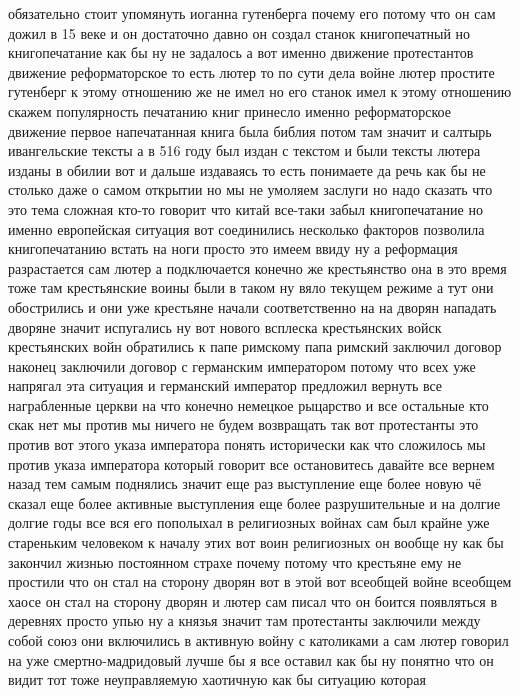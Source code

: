 обязательно стоит упомянуть иоганна гутенберга
почему его потому что он сам дожил в 15 веке и он достаточно давно он создал
станок книгопечатный но книгопечатание как бы ну не задалось а вот именно
движение протестантов движение реформаторское то есть лютер то по сути дела
войне лютер простите гутенберг к этому отношению же не имел но его станок имел к
этому отношению скажем популярность печатанию книг принесло именно
реформаторское движение первое напечатанная книга была библия потом там значит и
салтырь ивангельские тексты а в 516 году был издан с текстом и были тексты
лютера изданы в обилии вот и дальше издаваясь то есть понимаете да речь как бы
не столько даже о самом открытии но мы не умоляем заслуги но надо сказать что
это тема сложная кто-то говорит что китай все-таки забыл книгопечатание но
именно европейская ситуация вот соединились несколько факторов позволила
книгопечатанию встать на ноги просто это имеем ввиду ну а реформация
разрастается сам лютер а подключается конечно же крестьянство она в это время
тоже там крестьянские воины были в таком ну вяло текущем режиме а тут они
обострились и они уже крестьяне начали соответственно на на дворян нападать
дворяне значит испугались ну вот нового всплеска крестьянских войск крестьянских
войн обратились к папе римскому папа римский заключил договор наконец заключили
договор с германским императором потому что всех уже напрягал эта ситуация и
германский император предложил вернуть все награбленные церкви на что конечно
немецкое рыцарство и все остальные кто скак нет мы против мы ничего не будем
возвращать так вот протестанты это против вот этого указа императора понять
исторически как что сложилось мы против указа императора который говорит все
остановитесь давайте все вернем назад тем самым поднялись значит еще раз
выступление еще более новую чё сказал еще более активные выступления еще более
разрушительные и на долгие долгие годы все вся его пополыхал в религиозных
войнах сам был крайне уже стареньким человеком к началу этих вот воин
религиозных он вообще ну как бы закончил жизнью постоянном страхе почему потому
что крестьяне ему не простили что он стал на сторону дворян вот в этой вот
всеобщей войне всеобщем хаосе он стал на сторону дворян и лютер сам писал что он
боится появляться в деревнях просто упью ну а князья значит там протестанты
заключили между собой союз они включились в активную войну с католиками а сам
лютер говорил на уже смертно-мадридовый лучше бы я все оставил как бы ну понятно
что он видит тот тоже неуправляемую хаотичную как бы ситуацию которая 

